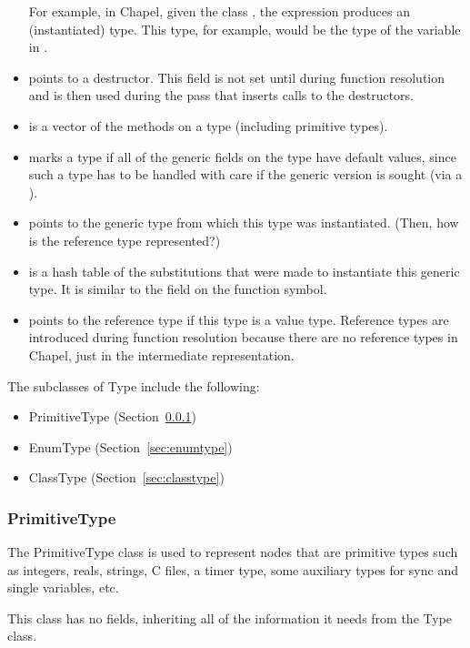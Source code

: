 \documentclass[10pt]{article}
\begin{document}
\begin{itemize}
  For example, in Chapel, given the class ,
  the expression  produces an (instantiated) type.
  This type, for example, would be the type of the variable 
  in .
\item {} points to a destructor.  This field is
  not set until during function resolution and is then used during the
  pass that inserts calls to the destructors.
\item {} is a vector of the methods on a
  type (including primitive types).
\item {} marks a type if all of the generic
  fields on the type have default values, since such a type has to be
  handled with care if the generic version is sought (via a ).
\item {} points to the generic type from
  which this type was instantiated.
  (Then, how is the reference type represented?)
\item {} is a hash table of the
  substitutions that were made to instantiate this generic type.  It
  is similar to the field on the function symbol.
\item {} points to the reference type if this
  type is a value type.  Reference types are introduced during
  function resolution because there are no reference types in Chapel,
  just in the intermediate representation.
\end{itemize}

The subclasses of Type include the following:
\begin{itemize}
\item PrimitiveType (Section~\ref{sec:primitivetype})
\item EnumType (Section~\ref{sec:enumtype})
\item ClassType (Section~\ref{sec:classtype})
\end{itemize}

\subsubsection{PrimitiveType}
\label{sec:primitivetype}

The PrimitiveType class is used to represent nodes that are primitive
types such as integers, reals, strings, C files, a timer type, some
auxiliary types for sync and single variables, etc.

This class has no fields, inheriting all of the information it needs
from the Type class.
\end{document}
